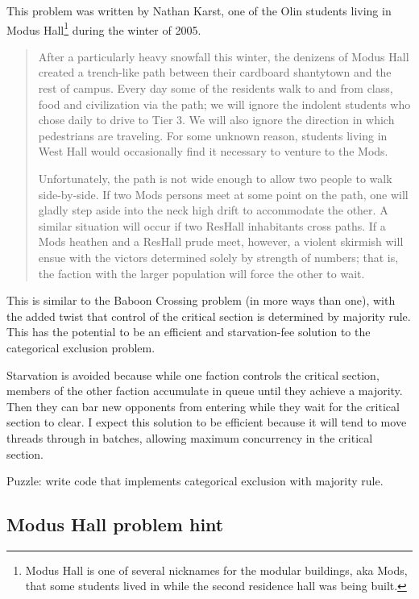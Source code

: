 \documentclass{book}
\newcommand{\clearemptydoublepage}{\newpage\cleardoublepage}
\begin{document}
This problem was written by Nathan Karst, one of the Olin students
living in Modus Hall\footnote{Modus Hall is one of several nicknames
for the modular buildings, aka Mods, that some students lived in while
the second residence hall was being built.} during the winter of 2005.

\begin{quote}
After a particularly heavy snowfall this winter, the denizens of Modus
Hall created a trench-like path between their cardboard shantytown and
the rest of campus.  Every day some of the residents walk to and from
class, food and civilization via the path; we will ignore the
indolent students who chose daily to drive to Tier 3.  We will also
ignore the direction in which pedestrians are traveling.  For some
unknown reason, students living in West Hall would occasionally find it
necessary to venture to the Mods.

Unfortunately, the path is not wide enough to allow two people
to walk side-by-side.  If two Mods persons meet at some point on the
path, one will gladly step aside into the neck high drift to accommodate
the other.  A similar situation will occur if two ResHall inhabitants
cross paths.  If a Mods heathen and a ResHall prude meet, however, a
violent skirmish will ensue with the victors determined solely by
strength of numbers; that is, the faction with the larger population will
force the other to wait.
\end{quote}

This is similar to the Baboon Crossing problem (in more ways than
one), with the added twist that control of the critical section is
determined by majority rule.  This has the potential to be an
efficient and starvation-fee solution to the categorical exclusion
problem.

Starvation is avoided because while one faction controls the critical
section, members of the other faction accumulate in queue until they
achieve a majority.  Then they can bar new opponents from entering
while they wait for the critical section to clear.  I expect this
solution to be efficient because it will tend to move threads through
in batches, allowing maximum concurrency in the critical section.

Puzzle: write code that implements categorical exclusion with
majority rule.



\clearemptydoublepage
\subsection {Modus Hall problem hint}
\end{document}
